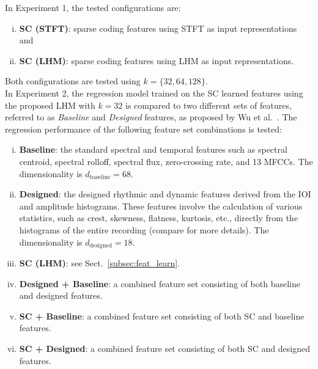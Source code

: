 \documentclass{ws-ijsc}
\begin{document}
In Experiment 1, the tested configurations are:%
\begin{enumerate}[(i)]
\item \textbf{SC (STFT)}: sparse coding features using STFT as input representations and
\item \textbf{SC (LHM)}: sparse coding features using LHM as input representations.
\end{enumerate}
Both configurations are tested using $k = \{32, 64, 128\}$.\\

In Experiment 2, the regression model trained on the SC learned features using the proposed LHM with $k = 32$ is compared to two different sets of features, referred to as \textit{Baseline} and \textit{Designed} features, as proposed by Wu et al.~\cite{Wu2016}. The regression performance of the following feature set combinations is tested:
\begin{enumerate}[(i)]
\item \textbf{Baseline}: the standard spectral and temporal features such as spectral centroid, spectral rolloff, spectral flux, zero-crossing rate, and 13 MFCCs. The dimensionality is $d_\mathrm{baseline} = 68$.
\item \textbf{Designed}: the designed rhythmic and dynamic features derived from the IOI and amplitude histograms. These features involve the calculation of various statistics, such as crest, skewness, flatness, kurtosis, etc., directly from the histograms of the entire recording (compare \cite{Wu2016} for more details). The dimensionality is $d_\mathrm{designed} = 18$. 

\item \textbf{SC (LHM)}: see Sect.~\ref{subsec:feat_learn}. %
\item \textbf{Designed + Baseline}: a combined feature set consisting of both baseline and designed features. %
\item \textbf{SC + Baseline}:  a combined feature set consisting of both SC and baseline features.
\item \textbf{SC + Designed}:  a combined feature set consisting of both SC and designed features.
\end{enumerate}
\end{document}
